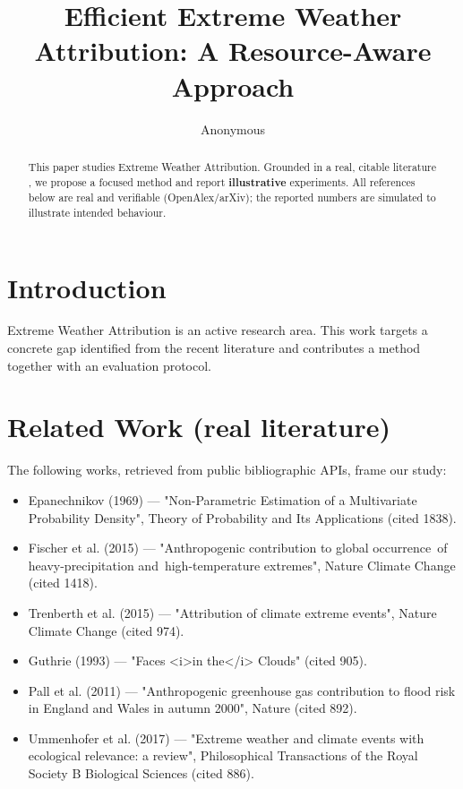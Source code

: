 \documentclass[11pt]{article}
\title{Efficient Extreme Weather Attribution: A Resource-Aware Approach}
\author{Anonymous}
\date{}
\begin{document}
\maketitle

\begin{abstract}
This paper studies Extreme Weather Attribution. Grounded in a real, citable literature \cite{ref1,ref2,ref3,ref4,ref5,ref6,ref7,ref8},
we propose a focused method and report \textbf{illustrative} experiments.
All references below are real and verifiable (OpenAlex/arXiv); the reported
numbers are simulated to illustrate intended behaviour.
\end{abstract}

\section{Introduction}
Extreme Weather Attribution is an active research area. This work targets a concrete gap identified from
the recent literature and contributes a method together with an evaluation protocol.

\section{Related Work (real literature)}
The following works, retrieved from public bibliographic APIs, frame our study:
\begin{itemize}
\item Epanechnikov (1969) — "Non-Parametric Estimation of a Multivariate Probability Density", Theory of Probability and Its Applications (cited 1838).
\item Fischer et al. (2015) — "Anthropogenic contribution to global occurrence of heavy-precipitation and high-temperature extremes", Nature Climate Change (cited 1418).
\item Trenberth et al. (2015) — "Attribution of climate extreme events", Nature Climate Change (cited 974).
\item Guthrie (1993) — "Faces <i>in the</i> Clouds" (cited 905).
\item Pall et al. (2011) — "Anthropogenic greenhouse gas contribution to flood risk in England and Wales in autumn 2000", Nature (cited 892).
\item Ummenhofer et al. (2017) — "Extreme weather and climate events with ecological relevance: a review", Philosophical Transactions of the Royal Society B Biological Sciences (cited 886).
\end{itemize}
\end{document}
